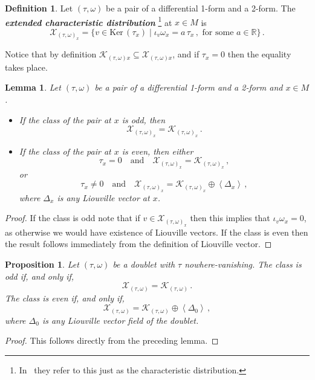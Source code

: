 \documentclass[11pt,twoside]{article}
\theoremstyle{plain}
\newtheorem{proposition}[theorem]{Proposition}
\newtheorem{lemma}[theorem]{Lemma}
\theoremstyle{definition}
\newtheorem{definition}[theorem]{Definition}
\newcommand{\R}{\mathbb{R}}
\newcommand*{\inn}[1]{\iota_{#1}}
\newcommand\dfn[1]{{\textbf{\emph{#1}}}}
\def\Ker{\mathrm{Ker \,}}
\def\K{\mathcal{K}}
\begin{document}
\begin{definition}
Let $(\tau,\omega)$ be a pair of a differential 1-form and a 2-form. 
The \dfn{extended characteristic distribution}%
\footnote{ In~\cite{GG_23} they refer to this just as the characteristic distribution.} 
at $x \in M $ is
$$
\mathcal{X}_{(\tau,\omega)_x} = 
\{ v  \in \Ker (\tau_x) \mid 
\inn{v} \omega_x = a \, \tau_x\,,  \text{ for some } a\in \R \}\,.
$$
\end{definition}
Notice that by definition 
$\K_{(\tau,\omega)x} \subseteq \mathcal{X}_{(\tau,\omega)x}$,
and if $\tau_x=0$ then the equality takes place.

\begin{lemma}
\label{prop_extended_dist}
Let $(\tau,\omega)$ be a pair of a differential 1-form and a 2-form and $x\in M$.
\begin{itemize}
    \item If the class of the pair at $x$ is odd, then
    $$ \mathcal{X}_{(\tau,\omega)_x} =  \K_{(\tau,\omega)_x} \,. $$

    \item  If the class of the pair at $x$ is even, then either
    $$ \tau_x = 0\quad\text{and}\quad\mathcal{X}_{(\tau,\omega)_x} =\K_{(\tau,\omega)_x} \,,$$
    or
    $$ \tau_x \neq 0 \quad \text{and}\quad\mathcal{X}_{(\tau,\omega)_x} = \K_{(\tau,\omega)_x} \oplus \left\langle \Delta_x \right\rangle\,,$$
    where $\Delta_x$ is any Liouville vector at $x$.
\end{itemize}
\end{lemma}   
\begin{proof} 
If the class is odd note that if 
$v\in \mathcal{X}_{(\tau,\omega)_x}$ 
then this implies that $\inn{v}\omega_x=0$, 
as otherwise we would have existence of Liouville vectors.
    If the class is even then the result follows immediately from the definition of Liouville vector.
\end{proof}

\begin{proposition}\label{prop:extended_char}
    Let $(\tau,\omega)$ be a doublet with $\tau$ nowhere-vanishing. The class is odd if, and only if,
    $$ \mathcal{X}_{(\tau,\omega)} =  \K_{(\tau,\omega)} \,. $$
    The class is even if, and only if,
    $$\mathcal{X}_{(\tau,\omega)} = \K_{(\tau,\omega)} \oplus \left\langle \Delta_0 \right\rangle \,,$$
    where $\Delta_0$ is any Liouville vector field of the doublet.
\end{proposition}
\begin{proof}
    This follows directly from the preceding lemma. 
\end{proof}
\end{document}
